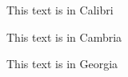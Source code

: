 \documentclass[12pt]{scrartcl}
\newenvironment{calibri}{\calibrifont}{\par}
\newenvironment{cambria}{\cambriafont}{\par}
\newenvironment{georgia}{\georgiafont}{\par}
\begin{document}
\begin{calibri}
This text is in Calibri
\end{calibri}
\begin{cambria}
This text is in Cambria
\end{cambria}
\begin{georgia}
This text is in Georgia
\end{georgia}
\end{document}
